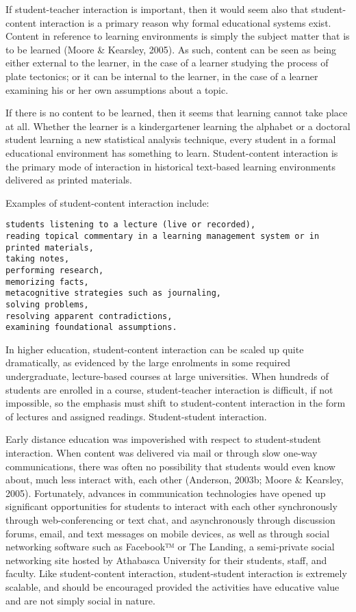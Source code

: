 \documentclass[
]{book}
\theoremstyle{definition}
\theoremstyle{definition}
\theoremstyle{definition}
\theoremstyle{definition}
\theoremstyle{remark}
\begin{document}
If student-teacher interaction is important, then it would seem also that student-content interaction is a primary reason why formal educational systems exist. Content in reference to learning environments is simply the subject matter that is to be learned (Moore \& Kearsley, 2005). As such, content can be seen as being either external to the learner, in the case of a learner studying the process of plate tectonics; or it can be internal to the learner, in the case of a learner examining his or her own assumptions about a topic.

If there is no content to be learned, then it seems that learning cannot take place at all. Whether the learner is a kindergartener learning the alphabet or a doctoral student learning a new statistical analysis technique, every student in a formal educational environment has something to learn. Student-content interaction is the primary mode of interaction in historical text-based learning environments delivered as printed materials.

Examples of student-content interaction include:

\begin{verbatim}
students listening to a lecture (live or recorded),
reading topical commentary in a learning management system or in printed materials,
taking notes,
performing research,
memorizing facts,
metacognitive strategies such as journaling,
solving problems,
resolving apparent contradictions,
examining foundational assumptions.
\end{verbatim}

In higher education, student-content interaction can be scaled up quite dramatically, as evidenced by the large enrolments in some required undergraduate, lecture-based courses at large universities. When hundreds of students are enrolled in a course, student-teacher interaction is difficult, if not impossible, so the emphasis must shift to student-content interaction in the form of lectures and assigned readings.
Student-student interaction.

Early distance education was impoverished with respect to student-student interaction. When content was delivered via mail or through slow one-way communications, there was often no possibility that students would even know about, much less interact with, each other (Anderson, 2003b; Moore \& Kearsley, 2005). Fortunately, advances in communication technologies have opened up significant opportunities for students to interact with each other synchronously through web-conferencing or text chat, and asynchronously through discussion forums, email, and text messages on mobile devices, as well as through social networking software such as Facebook™ or The Landing, a semi-private social networking site hosted by Athabasca University for their students, staff, and faculty. Like student-content interaction, student-student interaction is extremely scalable, and should be encouraged provided the activities have educative value and are not simply social in nature.
\end{document}
